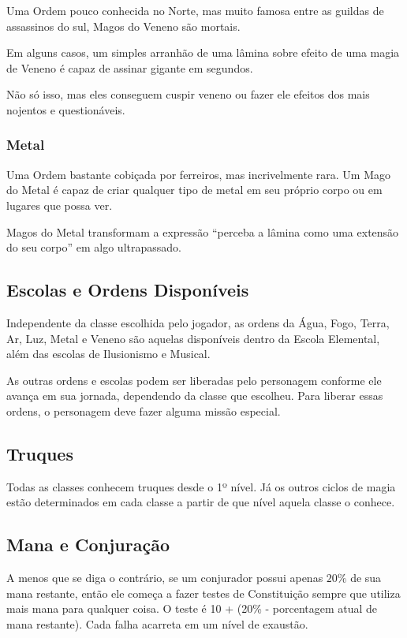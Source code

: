 \documentclass{RPG_Adventure}[2021/10/20]
\begin{document}
Uma Ordem pouco conhecida no Norte, mas muito famosa entre as guildas de
assassinos do sul, Magos do Veneno são mortais.

Em alguns casos, um simples arranhão de uma lâmina sobre efeito de uma magia de
Veneno é capaz de assinar gigante em segundos.

Não só isso, mas eles conseguem cuspir veneno ou fazer ele efeitos dos mais
nojentos e questionáveis.

\subsubsection*{Metal}%

Uma Ordem bastante cobiçada por ferreiros, mas incrivelmente rara. Um Mago do
Metal é capaz de criar qualquer tipo de metal em seu próprio corpo ou em lugares
que possa ver.

Magos do Metal transformam a expressão ``perceba a lâmina como uma extensão do
seu corpo'' em algo ultrapassado.

\subsection*{Escolas e Ordens Disponíveis}%
\label{sub:escolas_e_ordens_disponiveis}

Independente da classe escolhida pelo jogador, as ordens da Água, Fogo, Terra,
Ar, Luz, Metal e Veneno são aquelas disponíveis dentro da Escola Elemental, além
das escolas de Ilusionismo e Musical.

As outras ordens e escolas podem ser liberadas pelo personagem conforme ele
avança em sua jornada, dependendo da classe que escolheu. Para liberar essas
ordens, o personagem deve fazer alguma missão especial.

\subsection*{Truques}%
\label{sub:truques}

Todas as classes conhecem truques desde o 1º nível. Já os outros ciclos de magia
estão determinados em cada classe a partir de que nível aquela classe o conhece.

\subsection*{Mana e Conjuração}%
\label{sub:mana_e_conjuracao}

A menos que se diga o contrário, se um conjurador possui apenas $20\%$ de sua
mana restante, então ele começa a fazer testes de Constituição sempre que
utiliza mais mana para qualquer coisa. O teste é 10 + (20\% - porcentagem atual
de mana restante).  Cada falha acarreta em um nível de exaustão.
\end{document}
